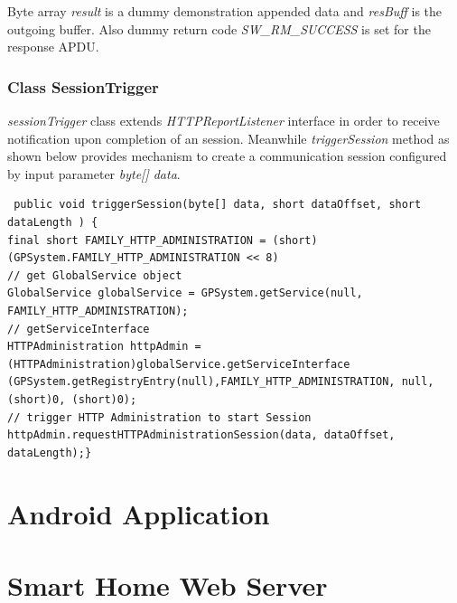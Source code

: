 Byte array \emph{result} is a dummy demonstration appended data and \emph{resBuff} is the outgoing buffer. Also dummy return code \emph{SW\_RM\_SUCCESS} is set for the response APDU.
\subsubsection{Class SessionTrigger}
\emph{sessionTrigger} class extends \emph{HTTPReportListener} interface in order to receive notification upon completion of an session. Meanwhile \emph{triggerSession} method as shown below provides mechanism to create a communication session configured by input parameter \emph{byte[] data}.

{\footnotesize 
\begin{verbatim}
 public void triggerSession(byte[] data, short dataOffset, short dataLength ) {
final short FAMILY_HTTP_ADMINISTRATION = (short) (GPSystem.FAMILY_HTTP_ADMINISTRATION << 8)
// get GlobalService object
GlobalService globalService = GPSystem.getService(null, FAMILY_HTTP_ADMINISTRATION);
// getServiceInterface
HTTPAdministration httpAdmin = (HTTPAdministration)globalService.getServiceInterface
(GPSystem.getRegistryEntry(null),FAMILY_HTTP_ADMINISTRATION, null, (short)0, (short)0);
// trigger HTTP Administration to start Session
httpAdmin.requestHTTPAdministrationSession(data, dataOffset, dataLength);}
\end{verbatim}
}

\section{Android Application}
\section{Smart Home Web Server}